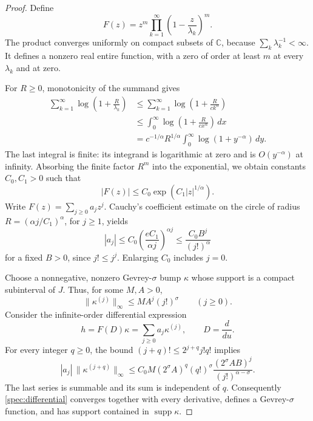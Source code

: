 \documentclass[11pt]{article}
\theoremstyle{definition}
\theoremstyle{remark}
\numberwithin{equation}{section}
\begin{document}
\begin{proof}
Define
\begin{equation}\label{spec:product}
 F(z)=z^m\prod_{k=1}^{\infty}
                 \left(1-\frac z{\lambda_k}\right)^m.
\end{equation}
The product converges uniformly on compact subsets of $\mathbb C$,
because $\sum_k\lambda_k^{-1}<\infty$. It defines a nonzero real
entire function, with a zero of order at least $m$ at every
$\lambda_k$ and at zero.

For $R\ge0$, monotonicity of the summand gives
\begin{align*}
 \sum_{k=1}^{\infty}\log\left(1+\frac R{\lambda_k}\right)
 &\le\sum_{k=1}^{\infty}\log\left(1+\frac R{c k^\alpha}\right)\\
 &\le\int_0^\infty\log\left(1+\frac R{c x^\alpha}\right)\,dx\\
 &=c^{-1/\alpha}R^{1/\alpha}
          \int_0^\infty\log(1+y^{-\alpha})\,dy.
\end{align*}
The last integral is finite: its integrand is logarithmic at zero
and is $O(y^{-\alpha})$ at infinity. Absorbing the finite factor
$R^m$ into the exponential, we obtain constants $C_0,C_1>0$ such that
\begin{equation}\label{spec:growth}
                   |F(z)|\le C_0\exp(C_1|z|^{1/\alpha}).
\end{equation}
Write $F(z)=\sum_{j\ge0}a_jz^j$. Cauchy's coefficient estimate on
the circle of radius $R=(\alpha j/C_1)^\alpha$, for $j\ge1$, yields
\[
 |a_j|\le C_0
       \left(\frac{eC_1}{\alpha j}\right)^{\alpha j}
       \le \frac{C_0 B^j}{(j!)^\alpha}
\]
for a fixed $B>0$, since $j!\le j^j$. Enlarging $C_0$ includes $j=0$.

Choose a nonnegative, nonzero Gevrey-$\sigma$ bump $\kappa$ whose
support is a compact subinterval of $J$. Thus, for some $M,A>0$,
\[
                    \|\kappa^{(j)}\|_\infty
                         \le M A^j(j!)^\sigma\qquad(j\ge0).
\]
Consider the infinite-order differential expression
\begin{equation}\label{spec:differential}
                  h=F(D)\kappa=\sum_{j\ge0}a_j\kappa^{(j)},
                  \qquad D=\frac d{du}.
\end{equation}
For every integer $q\ge0$, the bound
$(j+q)!\le2^{j+q}j!q!$ implies
\[
 |a_j|\,\|\kappa^{(j+q)}\|_\infty
 \le C_0M(2^\sigma A)^q(q!)^\sigma
                \frac{(2^\sigma AB)^j}{(j!)^{\alpha-\sigma}}.
\]
The last series is summable and its sum is independent of $q$.
Consequently \eqref{spec:differential} converges together with every
derivative, defines a Gevrey-$\sigma$ function, and has support
contained in $\operatorname{supp}\kappa$.


\end{proof}
\end{document}
